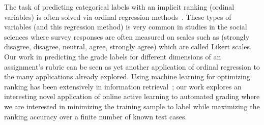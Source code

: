 The task of predicting categorical labels with an implicit ranking (ordinal
variables) is often solved via ordinal regression
methods~\cite{McCullagh:1980}. These types of variables (and this
regression method) is very common in studies in the social sciences where
survey responses are often measured on scales such as (strongly disagree,
disagree, neutral, agree, strongly agree) which are called Likert
scales. Our work in predicting the grade labels for different dimensions of
an assignment's rubric can be seen as yet another application of ordinal
regression to the many applications already explored. Using machine
learning for optimizing ranking has been extensively in information
retrieval~\cite{Liu:2009}; our work explores an interesting novel
application of online active learning to automated grading where we are
interested in minimizing the training sample to label while maximizing the
ranking accuracy over a finite number of known test cases.  
